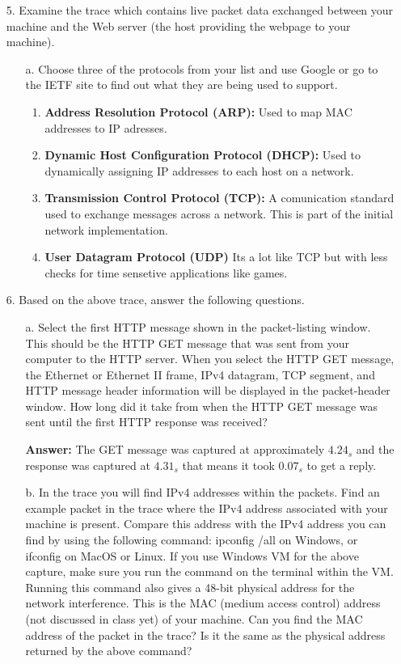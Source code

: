 \documentclass[12pt,letterpaper]{article}
\begin{document}
\begin{enumerate}
    \item[5.] Examine the trace which contains live packet data exchanged between your machine and the Web
server (the host providing the webpage to your machine).
    \begin{enumerate}
       \item[a.] Choose three of the protocols from your list and use Google or go to the IETF site to find
out what they are being used to support.
       \begin{enumerate}
           \item {\bf Address Resolution Protocol (ARP):} Used to map MAC addresses to IP adresses.
           \item {\bf Dynamic Host Configuration Protocol (DHCP):} Used to dynamically assigning IP addresses to each host on a network.
           \item {\bf Transmission Control Protocol (TCP):} A comunication standard used to exchange messages across a network. This is part of the initial network implementation.
           \item {\bf User Datagram Protocol (UDP)} Its a lot like TCP but with less checks for time sensetive applications like games.
       \end{enumerate}
    \end{enumerate}
    \item[6.] Based on the above trace, answer the following questions.
    \begin{enumerate}
        \item[a.] Select the first HTTP message shown in the packet-listing window. This should be the HTTP GET
message that was sent from your computer to the HTTP server. When you select the HTTP GET
message, the Ethernet or Ethernet II frame, IPv4 datagram, TCP segment, and HTTP message
header information will be displayed in the packet-header window. How long did it take from
when the HTTP GET message was sent until the first HTTP response was received?

        {\bf Answer:} The GET message was captured at approximately $4.24_s$ and the response was captured at $4.31_s$ that means it took $0.07_s$ to get a reply.

       \item[b.] In the trace you will find IPv4 addresses within the packets. Find an example packet in the trace
where the IPv4 address associated with your machine is present. Compare this address with the
IPv4 address you can find by using the following command: ipconfig /all on Windows, or ifconfig on
MacOS or Linux. If you use Windows VM for the above capture, make sure you run the command
on the terminal within the VM. Running this command also gives a 48-bit physical address for the
network interference. This is the MAC (medium access control) address (not discussed in class yet)
of your machine. Can you find the MAC address of the packet in the trace? Is it the same as the
physical address returned by the above command?


\end{enumerate}
\end{enumerate}
\end{document}
